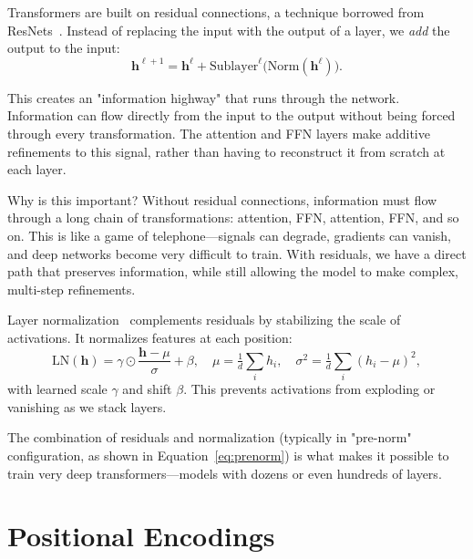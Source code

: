 Transformers are built on residual connections, a technique borrowed from ResNets~\citep{he2016resnet}. Instead of replacing the input with the output of a layer, we \emph{add} the output to the input:
\begin{equation}
\mathbf{h}^{\ell+1}=\mathbf{h}^{\ell} + \mathrm{Sublayer}^{\ell}\!\big(\mathrm{Norm}(\mathbf{h}^{\ell})\big).
\label{eq:prenorm}
\end{equation}

This creates an "information highway" that runs through the network. Information can flow directly from the input to the output without being forced through every transformation. The attention and FFN layers make additive refinements to this signal, rather than having to reconstruct it from scratch at each layer.

Why is this important? Without residual connections, information must flow through a long chain of transformations: attention, FFN, attention, FFN, and so on. This is like a game of telephone---signals can degrade, gradients can vanish, and deep networks become very difficult to train. With residuals, we have a direct path that preserves information, while still allowing the model to make complex, multi-step refinements.

Layer normalization~\citep{ba2016layernorm} complements residuals by stabilizing the scale of activations. It normalizes features at each position:
\begin{equation}
\mathrm{LN}(\mathbf{h})=\gamma\odot \frac{\mathbf{h}-\mu}{\sigma} + \beta,\quad
\mu=\tfrac{1}{d}\sum_i h_i,\quad \sigma^2=\tfrac{1}{d}\sum_i(h_i-\mu)^2,
\end{equation}
with learned scale $\gamma$ and shift $\beta$. This prevents activations from exploding or vanishing as we stack layers.

The combination of residuals and normalization (typically in "pre-norm" configuration, as shown in Equation~\eqref{eq:prenorm}) is what makes it possible to train very deep transformers---models with dozens or even hundreds of layers.

\vspace{1.2em}

\section{Positional Encodings}
\label{sec:positions}

